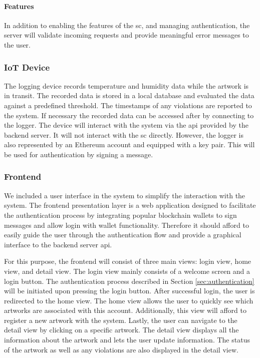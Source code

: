 \paragraph{Features}
In addition to enabling the features of the \gls{sc}, and managing authentication, the server will validate incoming requests and provide meaningful error messages to the user.

\subsubsection{IoT Device}
The logging device records temperature and humidity data while the artwork is in transit. The recorded data is stored in a local database and evaluated the data against a predefined threshold. The timestamps of any violations are reported to the system. If necessary the recorded data can be accessed after by connecting to the logger. The device will interact with the system via the \gls{api} provided by the backend server. It will not interact with the \gls{sc} directly. However, the logger is also represented by an Ethereum account and equipped with a key pair. This will be used for authentication by signing a message.

\subsubsection{Frontend}
We included a user interface in the system to simplify the interaction with the system. The frontend presentation layer is a web application designed to facilitate the authentication process by integrating popular blockchain wallets to sign messages and allow login with wallet functionality. Therefore it should afford to easily guide the user through the authentication flow and provide a graphical interface to the backend server \gls{api}.

For this purpose, the frontend will consist of three main views: login view, home view, and detail view. The login view mainly consists of a welcome screen and a login button. The authentication process described in Section \ref{sec:authentication} will be initiated upon pressing the login button. After successful login, the user is redirected to the home view. The home view allows the user to quickly see which artworks are associated with this account. Additionally, this view will afford to register a new artwork with the system. Lastly, the user can navigate to the detail view by clicking on a specific artwork. The detail view displays all the information about the artwork and lets the user update information. The status of the artwork as well as any violations are also displayed in the detail view.
